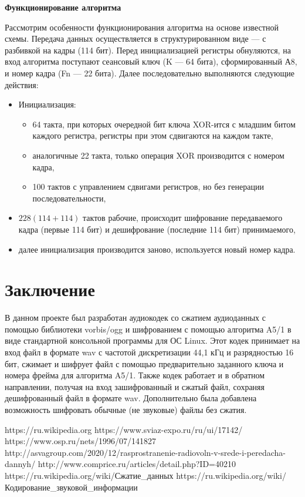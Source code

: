 \documentclass[a4paper]{report}
\begin{document}
\textbf{Функционирование алгоритма}

Рассмотрим особенности функционирования алгоритма на основе известной схемы. Передача данных осуществляется в структурированном виде — с разбивкой на кадры (114 бит). Перед инициализацией регистры обнуляются, на вход алгоритма поступают сеансовый ключ (K — 64 бита), сформированный А8, и номер кадра (Fn — 22 бита). Далее последовательно выполняются следующие действия:

\begin{itemize}
\item Инициализация:
\begin{itemize}
\item 64 такта, при которых очередной бит ключа XOR-ится с младшим битом каждого регистра, регистры при этом сдвигаются на каждом такте,
\item аналогичные 22 такта, только операция XOR производится с номером кадра,
\item 100 тактов с управлением сдвигами регистров, но без генерации последовательности,
\end{itemize}
\item $228 (114 + 114)$ тактов рабочие, происходит шифрование передаваемого кадра (первые 114 бит) и дешифрование (последние 114 бит) принимаемого,
\item далее инициализация производится заново, используется новый номер кадра.
\end{itemize}
\chapter*{Заключение}
В данном проекте был разработан аудиокодек со сжатием аудиоданных с помощью библиотеки vorbis/ogg и шифрованием с помощью алгоритма A5/1 в виде стандартной консольной программы для ОС Linux. Этот кодек принимает на вход файл в формате wav с частотой дискретизации 44,1 кГц и разрядностью 16 бит, сжимает и шифрует файл с помощью предварительно заданного ключа и номера фрейма для алгоритма A5/1. Также кодек работает и в обратном направлении, получая на вход зашифрованный и сжатый файл, сохраняя дешифрованный файл в формате wav. Дополнительно была добавлена возможность шифровать обычные (не звуковые) файлы без сжатия.


\newpage
\begin{thebibliography}{}
\bibitem{} https://ru.wikipedia.org
\bibitem{} https://www.sviaz-expo.ru/ru/ui/17142/
\bibitem{} https://www.osp.ru/nets/1996/07/141827
\bibitem{} http://asvagroup.com/2020/12/rasprostranenie-radiovoln-v-srede-i-peredacha-dannyh/
\bibitem{} http://www.comprice.ru/articles/detail.php?ID=40210
\bibitem{} https://ru.wikipedia.org/wiki/Сжатие\_данных
\bibitem{} https://ru.wikipedia.org/wiki/Кодирование\_звуковой\_информации

\end{thebibliography}
\end{document}
